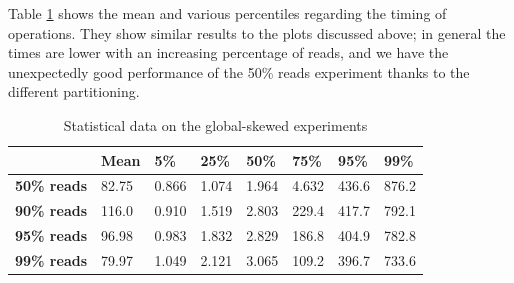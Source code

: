 Table \ref{tab:local-latencies-table} shows the mean and various percentiles regarding the timing of operations. They show similar results to the plots discussed above; in general the times are lower with an increasing percentage of reads, and we have the unexpectedly good performance of the 50\% reads experiment thanks to the different partitioning.

\begin{table}[!htb]
  \centering
  \begin{tabular}{l l l l l l l l}
    \hline
    & \textbf{Mean} & \textbf{5\%} & \textbf{25\%} & \textbf{50\%} & \textbf{75\%} & \textbf{95\%}& \textbf{99\%} \\
    \hline
    \textbf{50\% reads} & 82.75 & 0.866 & 1.074 & 1.964 & 4.632 & 436.6 & 876.2 \\
    \textbf{90\% reads} & 116.0 & 0.910 & 1.519 & 2.803 & 229.4 & 417.7 & 792.1 \\
    \textbf{95\% reads} & 96.98 & 0.983 & 1.832 & 2.829 & 186.8 & 404.9 & 782.8 \\
    \textbf{99\% reads} & 79.97 & 1.049 & 2.121 & 3.065 & 109.2 & 396.7 &  733.6 \\
    \hline
  \end{tabular}
  \caption{Statistical data on the global-skewed experiments}\label{tab:local-latencies-table}
\end{table}

